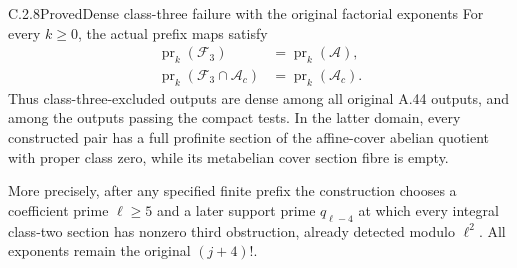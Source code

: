 \begin{result}{C.2.8}{Proved}{Dense class-three failure with the original factorial exponents}
\label{thm:ghost-dense-class3}
For every \(k\ge0\), the actual prefix maps satisfy
\[
 \begin{split}
 \operatorname{pr}_k(\mathscr F_3)
       &=\operatorname{pr}_k(\mathscr A),\\
 \operatorname{pr}_k(\mathscr F_3\cap\mathscr A_c)
       &=\operatorname{pr}_k(\mathscr A_c).
 \end{split}                                         \tag{64}
\]
Thus class-three-excluded outputs are dense among
all original A.44 outputs, and among the outputs
passing the compact tests. In the latter domain,
every constructed pair has a full profinite section
of the affine-cover abelian quotient with proper
class zero, while its metabelian cover section
fibre is empty.

More precisely, after any specified finite prefix
the construction chooses a coefficient prime
\(\ell\ge5\) and a later support prime
\(q_{\ell-4}\) at which every integral class-two
section has nonzero third obstruction, already
detected modulo \(\ell^2\). All exponents remain
the original \((j+4)!\).
\end{result}
